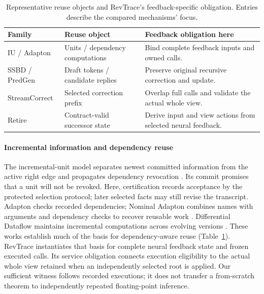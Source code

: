 \begin{table}[t]
\centering
\caption{Representative reuse objects and RevTrace's feedback-specific
obligation. Entries describe the compared mechanisms' focus.}
\label{tab:neighbor_objects}
\begingroup\small\setlength{\tabcolsep}{3pt}
\begin{tabular}{@{}>{\raggedright\arraybackslash}p{}>{\raggedright\arraybackslash}p{}>{\raggedright\arraybackslash}p{}@{}}
\toprule
Family & Reuse object & Feedback obligation here\\
\midrule
IU / Adapton & Units / dependency computations & Bind complete feedback
inputs and owned calls.\\
SSBD / PredGen & Draft tokens / candidate replies & Preserve original
recursive correction and update.\\
StreamCorrect & Selected correction prefix & Overlap full calls and
validate the actual whole view.\\
Retire & Contract-valid successor state & Derive input and view actions
from selected neural feedback.\\
\bottomrule
\end{tabular}\endgroup
\end{table}

\paragraph{Incremental information and dependency reuse}
The incremental-unit model separates newest committed information from
the active right edge and propagates dependency revocation
\cite{schlangen2011incremental}. Its commit promises that a unit will not
be revoked. Here, certification records acceptance by the protected
selection protocol; later selected facts may still revise the transcript.
Adapton checks recorded dependencies; Nominal Adapton combines names with
arguments and dependency checks to recover reusable work
\cite{hammer2014adapton,hammer2015names}. Differential Dataflow maintains
incremental computations across evolving versions
\cite{mcsherry2013differential}. These works establish much of the basis for
dependency-aware reuse (Table~\ref{tab:neighbor_objects}). RevTrace instantiates that basis for complete
neural feedback state and frozen executed calls. Its service obligation
connects execution eligibility to the actual whole view retained when an
independently selected root is applied.
Our sufficient witness follows recorded executions; it does not transfer a
from-scratch theorem to independently repeated floating-point inference.

